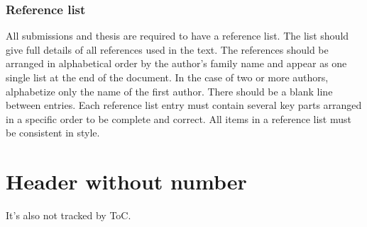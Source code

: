 \subsubsection{Reference list}

All submissions and thesis are required to have a reference list. The list should give full details of all references used in the text. The references should be arranged in alphabetical order by the author’s family name and appear as one single list at the end of the document. In the case of two or more authors, alphabetize only the name of the first author. There should be a blank line between entries. Each reference list entry must contain several key parts arranged in a specific order to be complete and correct. All items in a reference list must be consistent in style.

\section*{Header without number}

It's also not tracked by ToC.